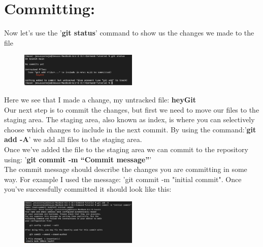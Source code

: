 \documentclass[10pt,twocolumn]{article}
\begin{document}
\newpage

\section{Committing:}
Now let's use the '\textbf{git status}' command to show us the changes we made to the file

\begin{figure}[h!]
\center
\includegraphics[width=0.5\textwidth]{screenshots/sc5.png}
\end{figure}

Here we see that I made a change, my untracked file: \textbf{heyGit}\\
Our next step is to commit the changes, but first we need to move our files to the staging area. The staging area, also known as index, is where you can selectively choose which changes to include in the next commit. By using the command:'\textbf{git add -A}' we add all files to the staging area.\\
Once we've added the file to the staging area we can commit to the repository using: '\textbf{git commit -m “Commit message”}'\\
The commit message should describe the changes you are committing in some way. For example I used the message: 'git commit -m "initial commit". Once you’ve successfully committed it should look like this:

\begin{figure}[h!]
\center
\includegraphics[width=0.5\textwidth]{screenshots/sc6.png}
\end{figure}

\newpage
\end{document}
